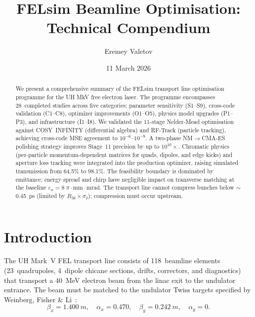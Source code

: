 \documentclass[11pt]{article}
\title{FELsim Beamline Optimisation:\\
  Technical Compendium}
\author{Eremey Valetov}
\date{11 March 2026}
\begin{document}
\maketitle

\begin{abstract}
We present a comprehensive summary of the FELsim transport line
optimisation programme for the UH MkV free electron laser.  The programme
encompasses 28~completed studies across five categories: parameter
sensitivity (S1--S9), cross-code validation (C1--C8), optimizer
improvements (O1--O5), physics model upgrades (P1--P3), and infrastructure
(I1--I8).  We validated the 11-stage Nelder-Mead optimisation against
COSY~INFINITY (differential algebra) and RF-Track (particle tracking),
achieving cross-code MSE agreement to $10^{-6}$--$10^{-9}$.  A two-phase
NM$\to$CMA-ES polishing strategy improves Stage~11 precision by up to
$10^{10}\times$.  Chromatic physics (per-particle momentum-dependent
matrices for quads, dipoles, and edge kicks) and aperture loss tracking
were integrated into the production optimizer, raising simulated
transmission from 64.5\% to 98.1\%.  The feasibility boundary is dominated
by emittance; energy spread and chirp have negligible impact on
transverse matching at the baseline $\varepsilon_n = 8\;
\pi\cdot\text{mm}\cdot\text{mrad}$.  The transport line cannot compress
bunches below $\sim$\SI{0.45}{ps} (limited by $R_{56} \times
\sigma_\delta$); compression must occur upstream.
\end{abstract}

\tableofcontents
\newpage


\section{Introduction}

The UH Mark~V FEL transport line consists of 118~beamline elements
(23~quadrupoles, 4~dipole chicane sections, drifts, correctors, and
diagnostics) that transport a \SI{40}{MeV} electron beam from the linac
exit to the undulator entrance.  The beam must be matched to the
undulator Twiss targets specified by Weinberg, Fisher \&
Li~\cite{weinberg2025}:
\begin{equation}
  \beta_x = \SI{1.400}{m},\quad
  \alpha_x = 0.470,\quad
  \beta_y = \SI{0.242}{m},\quad
  \alpha_y = 0.
  \label{eq:targets}
\end{equation}
\end{document}
